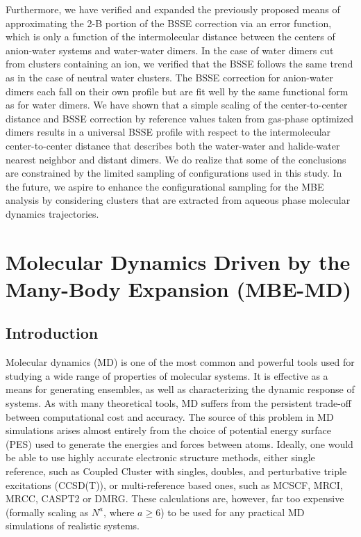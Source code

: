 \documentclass[11pt, proquest]{uwthesis}[2020/02/24]
\begin{document}
\par Furthermore, we have verified and expanded the previously proposed means of approximating the 2-B portion of the BSSE correction via an error function, which is only a function of the intermolecular distance between the centers of anion-water systems and water-water dimers. In the case of water dimers cut from clusters containing an ion, we verified that the BSSE follows the same trend as in the case of neutral water clusters. The BSSE correction for anion-water dimers each fall on their own profile but are fit well by the same functional form as for water dimers. We have shown that a simple scaling of the center-to-center distance and BSSE correction by reference values taken from gas-phase optimized dimers results in a universal BSSE profile with respect to the intermolecular center-to-center distance that describes both the water-water and halide-water nearest neighbor and distant dimers. We do realize that some of the conclusions are constrained by the limited sampling of configurations used in this study. In the future, we aspire to enhance the configurational sampling for the MBE analysis by considering clusters that are extracted from aqueous phase molecular dynamics trajectories.


\chapter{Molecular Dynamics Driven by the Many-Body Expansion (MBE-MD)}

\section{Introduction}

\par Molecular dynamics (MD) is one of the most common and powerful tools used for studying a wide range of properties of molecular systems.\autocite{bankura_hydration_2013,bernardi_enhanced_2015,durrant_molecular_2011,hospital_molecular_2015,probst_molecular_1985} It is effective as a means for generating ensembles, as well as characterizing the dynamic response of systems. As with many theoretical tools, MD suffers from the persistent trade-off between computational cost and accuracy. The source of this problem in MD simulations arises almost entirely from the choice of potential energy surface (PES) used to generate the energies and forces between atoms. Ideally, one would be able to use highly accurate electronic structure methods, either single reference, such as Coupled Cluster with singles, doubles, and perturbative triple excitations (CCSD(T)),\autocite{bartlett_coupled-cluster_1989} or multi-reference based ones, such as MCSCF\autocite{schmidt_construction_1998}, MRCI\autocite{werner_selfconsistent_1982}, MRCC\autocite{mukherjee_linked-cluster_1986}, CASPT2\autocite{finley_multi-state_1998} or DMRG.\autocite{schollwock_density-matrix_2005} These calculations are, however, far too expensive (formally scaling as $N^a$, where $a \geq 6$) to be used for any practical MD simulations of realistic systems.
\end{document}

